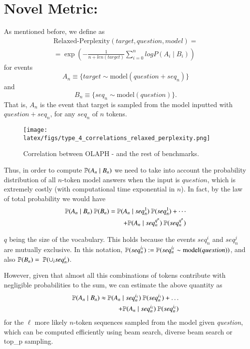 \section{Novel Metric: \relaxed{}} \label{apx:relaxed_perplexity}

As mentioned before, we define \relaxed{} as
\begin{equation*}
\begin{split}
    \text{Relaxed-Perplexity}(target, question, model) = \\
    = \exp\left(-\frac{1}{n + len(target)} \sum_{i=0}^n log P(A_i \mid B_i)\right)
\end{split}
\end{equation*}
for events \[A_n \equiv \{target \sim \text{model}(question + seq_n)\}\] and \[B_n \equiv \{seq_n \sim \text{model}(question)\}.\] That is, $A_n$ is the event that target is sampled from the model inputted with $question + seq_n$, for any $seq_n$ of $n$ tokens. 


\begin{figure}[t]
    \centering
    \texttt{[image: latex/figs/type\_4\_correlations\_relaxed\_perplexity.png]}
    \caption{Correlation between OLAPH - \relaxed{} and the rest of benchmarks.}
    \label{fig:correlations_olaph}
\end{figure} 


Thus, in order to compute $\mathbb{P}(A_n \mid B_n)$ we need to take into account the probability distribution of all $n$-token model answers when the input is $question$, which is extremely costly (with computational time exponential in $n$). 
In fact, by the law of total probability we would have
\begin{align*}
    \mathbb{P}(A_n \mid B_n)~\mathbb{P}(B_n) = \mathbb{P}(A_n \mid seq^1_n)~\mathbb{P}(seq^1_n) + \cdots \\
+ \mathbb{P}(A_n \mid seq^{q^n}_n)~\mathbb{P}(seq^{q^n}_n)
\end{align*}

$q$ being the size of the vocabulary. This holds because the events $seq^i_n$ and $seq^j_n$ are mutually exclusive. In this notation, $\mathbb{P}(seq_n^{i_{\ell}}) := \mathbb{P}(seq_n^{i_{\ell}} \sim \text{model}(question))$, and also $\mathbb{P}(B_n) = ~\mathbb{P}(\cup_{i} seq_n^{i})$.

However, given that almost all this combinations of tokens contribute with negligible probabilities to the sum, we can estimate the above quantity as
\begin{align*}
    \mathbb{P}(A_n \mid B_n) \approx \mathbb{P}(A_n \mid seq^{i_1}_n)~\mathbb{P}(seq^{i_1}_n) + \hdots \\
+ \mathbb{P}(A_n \mid seq^{i_\ell}_n)~\mathbb{P}(seq^{i_\ell}_n)
\end{align*}
for the $\ell$ more likely $n$-token sequences sampled from the model given \emph{question}, which can be computed efficiently using beam search, diverse beam search \cite{vijayakumar2016diverse} or top\_p sampling. 

